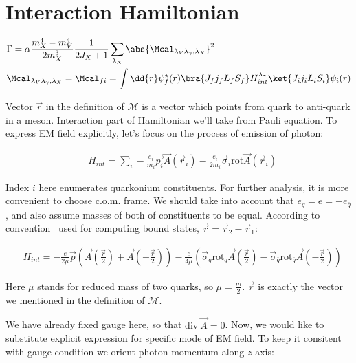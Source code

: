 \section{Interaction Hamiltonian} \label{sec:app:hint}

\begin{align}
    &\Gamma = \alpha \frac{m_X^4 - m_V^4}{2 m_X^3} \frac{1}{2J_X + 1} \sum_{\lambda_X} \abs{\Mcal_{\lambda_V \lambda_\gamma, \lambda_X}}^2 \\
    &\Mcal_{\lambda_V \lambda_\gamma, \lambda_X} = \Mcal_{fi} = \int \dd{r} \psi_f^\star(r) \bra{J_f j_f L_f S_f} H_{int}^{\lambda_\gamma} \ket{J_i j_i L_i S_i} \psi_i(r)
\end{align}

Vector $\vec{r}$ in the definition of $\mathcal{M}$ is a vector which points from quark to anti-quark in a meson. Interaction part of Hamiltonian we'll take from Pauli equation. To express EM field explicitly, let's focus on the process of emission of photon:

\begin{align}
    &H_{int} = \sum_{i} -\frac{e_i}{m_i} \vec{p_i} \vec{A}(\vec{r}_i) - \frac{e_i}{2 m_i} \vec{\sigma}_i \mathrm{rot} \vec{A}(\vec{r}_i)
\end{align}

Index $i$ here enumerates quarkonium constituents. For further analysis, it is more convenient to choose c.o.m. frame. We should take into account that $e_q = e = - e_{\overline{q}}$, and also assume masses of both of constituents to be equal. According to convention~\cite{deng-charm} used for computing bound states, $\vec{r} = \vec{r}_2 - \vec{r}_1$:

\begin{align}
    &H_{int} = -\frac{e}{2 \mu} \vec{p} \left( \vec{A}(\frac{\vec{r}}{2}) + \vec{A}(-\frac{\vec{r}}{2}) \right) - \frac{e}{4 \mu} \left( \vec{\sigma}_{q} \mathrm{rot}_{q} \vec{A}(\frac{\vec{r}}{2}) - \vec{\sigma}_{\overline{q}} \mathrm{rot}_{\overline{q}} \vec{A}(-\frac{\vec{r}}{2}) \right)
\end{align}

Here $\mu$ stands for reduced mass of two quarks, so $\mu = \frac{m}{2}$. $\vec{r}$ is exactly the vector we mentioned in the definition of $\mathcal{M}$.

We have already fixed gauge here, so that $\mathrm{div}~\vec{A} = 0$.\cite{tong-qed}
Now, we would like to substitute explicit expression for specific mode of
EM field. To keep it consitent with gauge condition we orient photon
momentum along $z$ axis:

